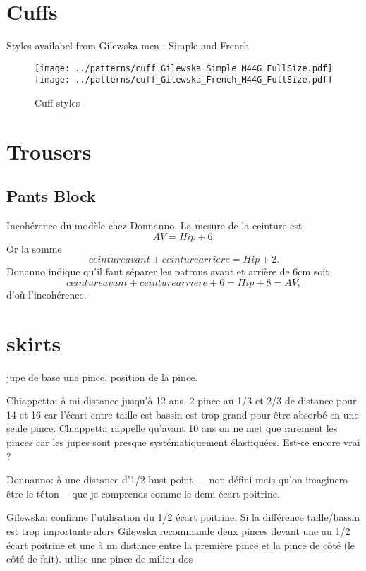 \documentclass[10pt,a4paper,twoside]{report}
\begin{document}
\section{Cuffs}
Styles availabel from Gilewska men : Simple and French

\begin{figure}
\begin{center}
\texttt{[image: ../patterns/cuff\_Gilewska\_Simple\_M44G\_FullSize.pdf]}
\texttt{[image: ../patterns/cuff\_Gilewska\_French\_M44G\_FullSize.pdf]}
\end{center}
\caption{Cuff styles}
\end{figure}

\section{Trousers}


\subsection{Pants Block}

Incohérence du modèle chez Donnanno. La mesure de la ceinture est
$$AV = Hip + 6.$$
Or la somme
$$ceinture avant + ceinture arriere = Hip +2.$$
Donanno indique qu'il faut séparer les patrons avant et arrière de 6cm soit
$$ceinture avant + ceinture arriere + 6 = Hip +8 = AV,$$
d'où l'incohérence.

\section{skirts}

jupe de base une pince. position de la pince.

Chiappetta: à mi-distance jusqu'à 12 ans. 2 pince au 1/3 et 2/3 de distance pour 14 et 16 car l'écart entre taille est bassin est trop grand pour être absorbé en une seule pince. Chiappetta rappelle qu'avant 10 ans on ne met que rarement les pinces car les jupes sont presque systématiquement élastiquées. Est-ce encore vrai ?

Donnanno: à une distance d'1/2 bust point --- non défini mais qu'on imaginera être le téton--- que je comprends comme le demi écart poitrine.

Gilewska: confirme l'utilisation du 1/2 écart poitrine. Si la différence taille/bassin est trop importante alors Gilewska recommande deux pinces devant une au 1/2 écart poitrine et une à mi distance entre la première pince et la pince de côté (le côté de fait). utlise une pince de milieu dos



\end{document}
